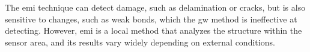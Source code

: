 The \ac{emi} technique can detect damage, such as delamination or cracks, but is also sensitive to changes, such as weak bonds, which the \ac{gw} method is ineffective at detecting. However, \ac{emi} is a local method that analyzes the structure within the sensor area, and its results vary widely depending on external conditions.

